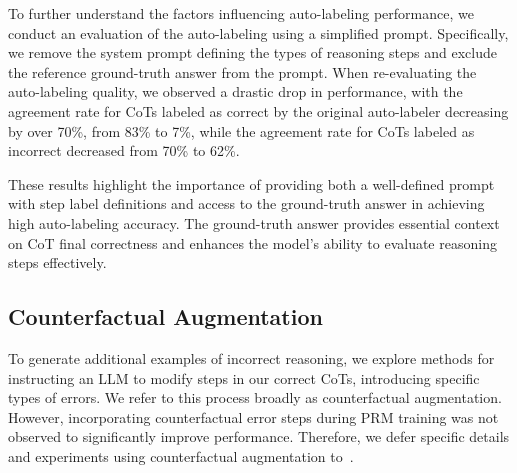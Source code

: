 To further understand the factors influencing auto-labeling performance,
we conduct an evaluation of the auto-labeling using a simplified prompt.
Specifically, we remove the system prompt defining the types of reasoning steps and exclude the reference ground-truth answer from the prompt.
When re-evaluating the auto-labeling quality,
we observed a drastic drop in performance, with the agreement rate for CoTs labeled as correct by the original auto-labeler decreasing by over 70\%,
from 83\% to 7\%, while
the agreement rate for CoTs labeled as incorrect decreased
from 70\% to 62\%.


These results highlight the importance of providing both a well-defined prompt with step label definitions and access to the ground-truth answer in achieving high auto-labeling accuracy.
The ground-truth answer provides essential context on CoT final correctness and enhances the model's ability to evaluate reasoning steps effectively.


\subsection{Counterfactual Augmentation}


To generate additional examples of incorrect reasoning,
we explore methods for instructing an LLM to modify steps in our correct CoTs,
introducing specific types of errors.
We refer to this process broadly as counterfactual augmentation.
However, incorporating counterfactual error steps during PRM training was not observed to significantly improve performance.
Therefore, we defer specific details and experiments using counterfactual augmentation to~.
